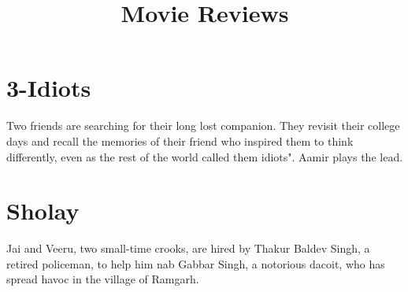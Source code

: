 \documentclass{article}
\title{Movie Reviews}
\begin{document}
	\maketitle
	\section{3-Idiots}
	\large{Two friends are searching for their long lost companion. They revisit their college days and recall the memories of their friend who inspired them to think differently, even as the rest of the world called them idiots". Aamir plays the lead.}
	\section{Sholay}
	\large{Jai and Veeru, two small-time crooks, are hired by Thakur Baldev Singh, a retired policeman, to help him nab Gabbar Singh, a notorious dacoit, who has spread havoc in the village of Ramgarh.}
\end{document}
